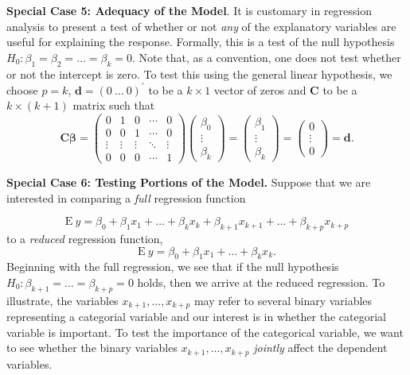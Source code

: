 \textbf{Special Case 5: Adequacy of the Model}. It is customary in
regression analysis to present a test of whether or not \emph{any}
of the explanatory variables are useful for explaining the response.
Formally, this is a test of the null hypothesis $H_0:\beta
_1=\beta_2=\ldots=\beta_k=0$. Note that, as a convention, one does
not test whether or not the intercept
is zero. To test this using the general linear hypothesis, we choose $p=k$, $%
\mathbf{d=}\left( 0~\ldots~0\right) ^{\prime}$ to be a $k\times 1$
vector of zeros and $\mathbf{C}$ to be a $k\times (k+1)$ matrix such
that
\begin{equation*}
\mathbf{C \boldsymbol \beta =}\left(
\begin{array}{ccccc}
0 & 1 & 0 & \cdots  & 0 \\
0 & 0 & 1 & \cdots  & 0 \\
\vdots  & \vdots  & \vdots  & \ddots  & \vdots  \\
0 & 0 & 0 & \cdots  & 1%
\end{array}%
\right) \left(
\begin{array}{c}
\beta_0 \\
\vdots  \\
\beta_k%
\end{array}%
\right) =\left(
\begin{array}{c}
\beta_1 \\
\vdots  \\
\beta_k%
\end{array}%
\right)  =\left(
\begin{array}{c}
0 \\
\vdots  \\
0
\end{array}%
\right) =\mathbf{d}.
\end{equation*}


\textbf{Special Case 6: Testing Portions of the Model.} Suppose that
we are interested in comparing a \emph{full} regression function

\begin{equation*}
\mathrm{E~}y = \beta_0 + \beta_1 x_1 +\ldots + \beta_k x_k + \beta
_{k+1} x_{k+1} + \ldots + \beta_{k+p} x_{k+p}
\end{equation*}
to a \emph{reduced} regression function,
\begin{equation*}
\mathrm{E~}y = \beta_0 + \beta_1 x_1 + \ldots + \beta_k x_k.
\end{equation*}
Beginning with the full regression, we see that if the null
hypothesis $H_0:\beta_{k+1} = \ldots = \beta_{k+p} = 0$ holds, then
we arrive at the reduced regression. To illustrate, the variables
$x_{k+1}, \ldots, x_{k+p}$ may refer to several binary variables
representing a categorial variable and our interest is in whether
the categorial variable is important. To test the importance of the
categorical variable, we want to see whether the binary variables
$x_{k+1}, \ldots, x_{k+p}$ \emph{jointly} affect the dependent
variables.

